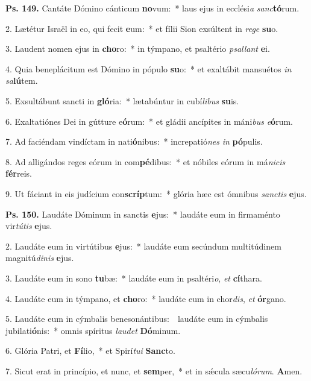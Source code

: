 \textbf{Ps. 149.} Cantáte Dómino cánticum \textbf{no}vum:~* laus ejus in ecclési\textit{a} \textit{sanc}\textbf{tó}rum.

2. Lætétur Israël in eo, qui fecit \textbf{e}um:~* et fílii Sion exsúltent in \textit{re}\textit{ge} \textbf{su}o.

3. Laudent nomen ejus in \textbf{cho}ro:~* in týmpano, et psaltério \textit{psal}\textit{lant} \textbf{e}i.

4. Quia beneplácitum est Dómino in pópulo \textbf{su}o:~* et exaltábit mansuétos \textit{in} \textit{sa}\textbf{lú}tem.

5. Exsultábunt sancti in \textbf{gló}ria:~* lætabúntur in cubí\textit{li}\textit{bus} \textbf{su}is.

6. Exaltatiónes Dei in gútture e\textbf{ó}rum:~* et gládii ancípites in máni\textit{bus} \textit{e}\textbf{ó}rum.

7. Ad faciéndam vindíctam in nati\textbf{ó}nibus:~* increpatió\textit{nes} \textit{in} \textbf{pó}pulis.

8. Ad alligándos reges eórum in com\textbf{pé}dibus:~* et nóbiles eórum in má\textit{ni}\textit{cis} \textbf{fér}reis.

9. Ut fáciant in eis judícium con\textbf{scríp}tum:~* glória hæc est ómnibus \textit{sanc}\textit{tis} \textbf{e}jus.

\textbf{Ps. 150.} Laudáte Dóminum in sanctis \textbf{e}jus:~* laudáte eum in firmaménto vir\textit{tú}\textit{tis} \textbf{e}jus.

2. Laudáte eum in virtútibus \textbf{e}jus:~* laudáte eum secúndum multitúdinem magnitú\textit{di}\textit{nis} \textbf{e}jus.

3. Laudáte eum in sono \textbf{tu}bæ:~* laudáte eum in psaltéri\textit{o}, \textit{et} \textbf{cí}thara.

4. Laudáte eum in týmpano, et \textbf{cho}ro:~* laudáte eum in chor\textit{dis}, \textit{et} \textbf{ór}gano.

5. Laudáte eum in cýmbalis benesonántibus:~\GreDagger\ laudáte eum in cýmbalis jubilati\textbf{ó}nis:~* omnis spíritus \textit{lau}\textit{det} \textbf{Dó}minum.

6. Glória Patri, et \textbf{Fí}lio,~* et Spirí\textit{tu}\textit{i} \textbf{Sanc}to.

7. Sicut erat in princípio, et nunc, et \textbf{sem}per,~* et in s\'{\ae}cula sæcu\textit{ló}\textit{rum}. \textbf{A}men.